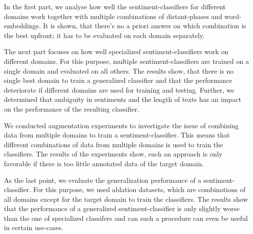 In the first part, we analyse how well the sentiment-classifiers for different domains work together with multiple combinations of distant-phases and word-embeddings. It is shown, that there's no a priori answer on which combination is the best upfront; it has to be evaluated on each domain separately.

The next part focuses on how well specialized sentiment-classifiers work on different domains. For this purpose, multiple sentiment-classifiers are trained on a single domain and evaluated on all others. The results show, that there is no single best domain to train a generalized classifier and that the performance deteriorate if different domains are used for training and testing. Further, we determined that ambiguity in sentiments and the length of texts has an impact on the performance of the resulting classifier.

We conducted augmentation experiments to investigate the issue of combining data from multiple domains to train a sentiment-classifier. This means that different combinations of data from multiple domains is used to train the classifiers. The results of the experiments show, such an approach is only favorable if there is too little annotated data of the target domain.

As the last point, we evaluate the generalization performance of a sentiment-classifier. For this purpose, we used ablation datasets, which are combinations of all domains except for the target domain to train the classifiers. The results show that the performance of a generalized sentiment-classifier is only slightly worse than the one of specialized classifers and can such a procedure can even be useful in certain use-cases.
